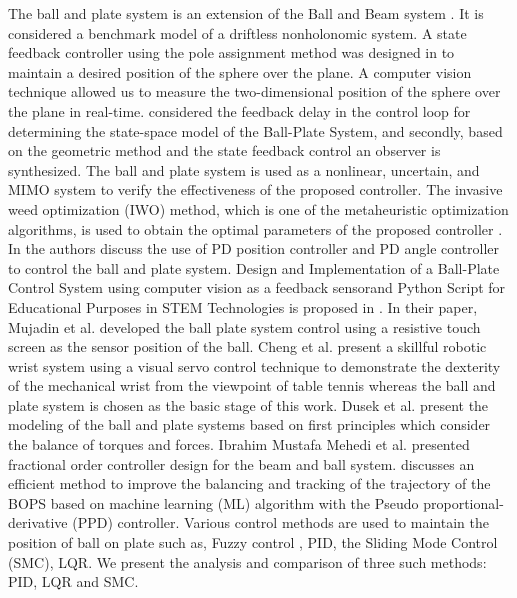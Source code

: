 \documentclass[conference]{IEEEtran}
\begin{document}
The ball and plate system is an extension of the Ball and Beam system \cite{b1}. It is considered a benchmark model of a driftless nonholonomic system. A state feedback controller using the pole assignment method was designed in \cite{b2} to maintain a desired position of the sphere over the plane. A computer vision technique allowed us to measure the two-dimensional position of the sphere over the plane in real-time. \cite{b3} considered the feedback delay in the control loop for determining the state-space model of the Ball-Plate System, and secondly, based on the geometric method and the state feedback control an observer is synthesized. The ball and plate system is used as a nonlinear, uncertain, and MIMO system to verify the effectiveness of the proposed controller.  The invasive weed optimization (IWO) method, which is one of the metaheuristic optimization algorithms, is used to obtain the optimal parameters of the proposed controller \cite{b4}. In \cite{b5} the authors discuss the use of PD position controller and PD angle controller to control the ball and plate system. Design and Implementation of a Ball-Plate Control System using computer vision as a feedback sensorand Python Script for Educational Purposes in STEM Technologies is proposed in \cite{b6}. In their paper, Mujadin et al. \cite{b7} developed the ball plate system control using a resistive touch screen as the sensor position of the ball.  Cheng et al. \cite{b8} present a skillful robotic wrist system using a visual servo control technique to demonstrate the dexterity of the mechanical wrist from the viewpoint of table tennis whereas the ball and plate system is chosen as the basic stage of this work. Dusek et al. \cite{b9} present the modeling of the ball and plate systems based on first principles which consider the balance of torques and forces.  Ibrahim Mustafa Mehedi et al. \cite{b10} presented fractional order controller design for the beam and ball system. \cite{b11} discusses an efficient method to improve the balancing and tracking of the trajectory of the BOPS based on machine learning (ML) algorithm with the Pseudo proportional-derivative (PPD) controller. 
Various control methods are used to maintain the position of ball on plate such as, Fuzzy control \cite{b12}, PID\cite{b13}, the Sliding Mode Control (SMC)\cite{b14}, LQR\cite{b15}. We present the analysis and comparison of three such methods: PID, LQR and SMC.
\end{document}
